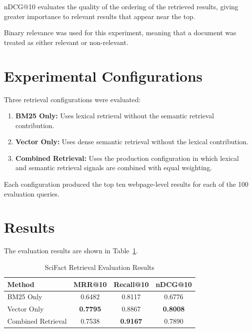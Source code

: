 \documentclass{tietreport}
\begin{document}
nDCG@10 evaluates the quality of the ordering of the retrieved
results, giving greater importance to relevant results that
appear near the top.

Binary relevance was used for this experiment, meaning that a
document was treated as either relevant or non-relevant.

\section{Experimental Configurations}

Three retrieval configurations were evaluated:

\begin{enumerate}

    \item \textbf{BM25 Only:}
    Uses lexical retrieval without the semantic retrieval
    contribution.

    \item \textbf{Vector Only:}
    Uses dense semantic retrieval without the lexical
    contribution.

    \item \textbf{Combined Retrieval:}
    Uses the production configuration in which lexical and
    semantic retrieval signals are combined with equal
    weighting.

\end{enumerate}

Each configuration produced the top ten webpage-level results
for each of the 100 evaluation queries.

\section{Results}

The evaluation results are shown in Table~\ref{tab:evaluation}.

\begin{table}[H]
\centering
\begin{tabular}{lccc}
\toprule
\textbf{Method}
& \textbf{MRR@10}
& \textbf{Recall@10}
& \textbf{nDCG@10} \\
\midrule
BM25 Only
& 0.6482
& 0.8117
& 0.6776 \\

Vector Only
& \textbf{0.7795}
& 0.8867
& \textbf{0.8008} \\

Combined Retrieval
& 0.7538
& \textbf{0.9167}
& 0.7890 \\

\bottomrule
\end{tabular}
\caption{SciFact Retrieval Evaluation Results}
\label{tab:evaluation}
\end{table}
\end{document}
